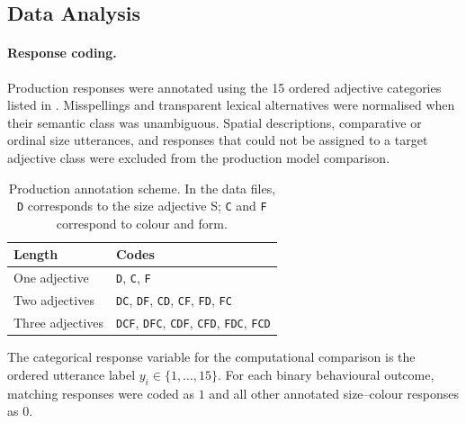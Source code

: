 \documentclass[10pt,a4paper,fleqn]{article}
\newcommand{\adj}[1]{\textsc{#1}}
\begin{document}
\subsection{Data Analysis}

\paragraph{Response coding.}
Production responses were annotated using the 15 ordered adjective categories listed in .
Misspellings and transparent lexical alternatives were normalised when their semantic class was unambiguous.
Spatial descriptions, comparative or ordinal size utterances, and responses that could not be assigned to a target adjective class were excluded from the production model comparison.

\begin{table}[H]
\centering
\caption{Production annotation scheme.
In the data files, \texttt{D} corresponds to the size adjective \adj{S}; \texttt{C} and \texttt{F} correspond to colour and form.}
\label{tab:production-coding}
\footnotesize
\begin{tabularx}{0.85\textwidth}{p{2.4cm}X}
\hline
Length & Codes \\
\hline
One adjective & \texttt{D}, \texttt{C}, \texttt{F} \\
Two adjectives & \texttt{DC}, \texttt{DF}, \texttt{CD}, \texttt{CF}, \texttt{FD}, \texttt{FC} \\
Three adjectives & \texttt{DCF}, \texttt{DFC}, \texttt{CDF}, \texttt{CFD}, \texttt{FDC}, \texttt{FCD} \\
\hline
\end{tabularx}
\end{table}

The categorical response variable for the computational comparison is the ordered utterance label $y_i\in\{1,\ldots,15\}$.
For each binary behavioural outcome, matching responses were coded as $1$ and all other annotated size--colour responses as $0$.
\end{document}
